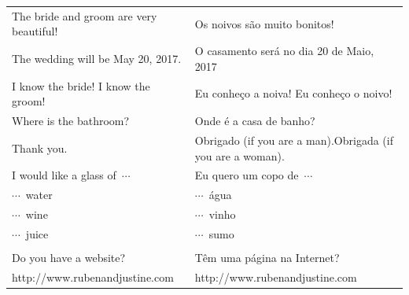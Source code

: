 \documentclass[9pt]{article}
\begin{document}
\pagestyle{empty}


\begin{tabular}{p{2in}|p{2in}}
  The bride and groom are very beautiful!
  &
  Os noivos são muito bonitos!
  \vspace{4pt}
  \\
  The wedding will be May 20, 2017.
  \vspace{4pt}
  &
  O casamento será no dia 20 de Maio, 2017
  \\
  I know the bride! I know the groom! 
  \vspace{4pt}
  &
  Eu conheço a noiva! Eu conheço o noivo!
  \\
  Where is the bathroom?
  \vspace{4pt} 
  &
  Onde é a casa de banho?
  \\
  Thank you.
  &
  Obrigado (if you are a man).\newline Obrigada (if you are a woman).
  \vspace{4pt}
  \\
  I would like a glass of~$\cdots$
  &
  Eu quero um copo de~$\cdots$
  \\
  \hspace{4pt}$\cdots$~water & \hspace{4pt}$\cdots$~água\\
  \hspace{4pt}$\cdots$~wine & \hspace{4pt}$\cdots$~vinho\\
  \hspace{4pt}$\cdots$~juice & \hspace{4pt}$\cdots$~sumo\\
  \vspace{4pt}
  \\
  Do you have a website? & Têm uma página na Internet?\\
  {http://www.rubenandjustine.com} & {http://www.rubenandjustine.com}\\
\end{tabular}
\vspace{1in}
\end{document}
